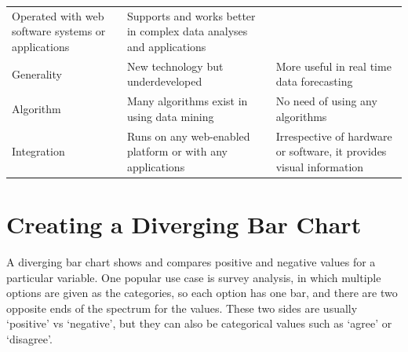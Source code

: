 \documentclass[]{book}
\theoremstyle{definition}
\theoremstyle{definition}
\theoremstyle{definition}
\theoremstyle{remark}
\begin{document}
\begin{longtable}[]{@{}lll@{}}
\begin{minipage}[t]{0.41\columnwidth}
Operated with web software systems or applications\strut
\end{minipage} & \begin{minipage}[t]{0.41\columnwidth}\raggedright\strut
Supports and works better in complex data analyses and
applications\strut
\end{minipage}\tabularnewline
\begin{minipage}[t]{0.08\columnwidth}\raggedright\strut
Generality\strut
\end{minipage} & \begin{minipage}[t]{0.41\columnwidth}\raggedright\strut
New technology but underdeveloped\strut
\end{minipage} & \begin{minipage}[t]{0.41\columnwidth}\raggedright\strut
More useful in real time data forecasting\strut
\end{minipage}\tabularnewline
\begin{minipage}[t]{0.08\columnwidth}\raggedright\strut
Algorithm\strut
\end{minipage} & \begin{minipage}[t]{0.41\columnwidth}\raggedright\strut
Many algorithms exist in using data mining\strut
\end{minipage} & \begin{minipage}[t]{0.41\columnwidth}\raggedright\strut
No need of using any algorithms\strut
\end{minipage}\tabularnewline
\begin{minipage}[t]{0.08\columnwidth}\raggedright\strut
Integration\strut
\end{minipage} & \begin{minipage}[t]{0.41\columnwidth}\raggedright\strut
Runs on any web-enabled platform or with any applications\strut
\end{minipage} & \begin{minipage}[t]{0.41\columnwidth}\raggedright\strut
Irrespective of hardware or software, it provides visual
information\strut
\end{minipage}\tabularnewline
\bottomrule
\end{longtable}

\section{Creating a Diverging Bar
Chart}\label{creating-a-diverging-bar-chart}

A diverging bar chart shows and compares positive and negative values
for a particular variable. One popular use case is survey analysis, in
which multiple options are given as the categories, so each option has
one bar, and there are two opposite ends of the spectrum for the values.
These two sides are usually `positive' vs `negative', but they can also
be categorical values such as `agree' or `disagree'.
\end{document}
